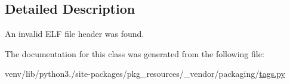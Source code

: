 \subsection{Detailed Description}
\begin{DoxyVerb}An invalid ELF file header was found.
\end{DoxyVerb}
 

The documentation for this class was generated from the following file\+:\begin{DoxyCompactItemize}
\item 
venv/lib/python3./site-\/packages/pkg\+\_\+resources/\+\_\+vendor/packaging/\hyperlink{pkg__resources_2__vendor_2packaging_2tags_8py}{tags.\+py}\end{DoxyCompactItemize}
